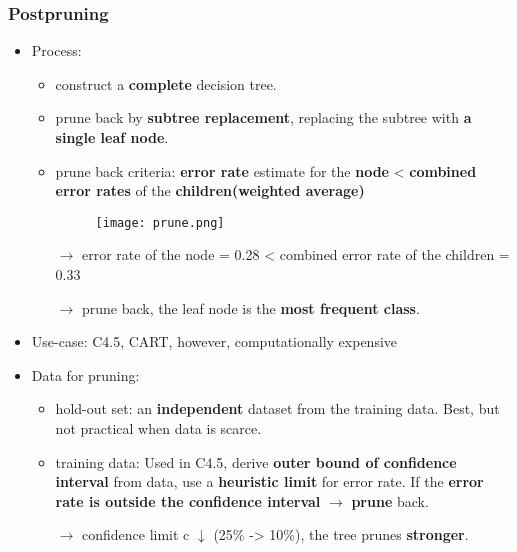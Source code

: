 \subsubsection{Postpruning}
\begin{itemize}
	
	\item Process: 
	\begin{itemize}
		\item construct a \textbf{complete} decision tree.
		\item prune back by \textbf{subtree replacement}, replacing the subtree with \textbf{a single leaf node}.
		\item prune back criteria: \textbf{error rate} estimate for the \textbf{node} < \textbf{combined error rates} of the \textbf{children(weighted average)} 
		
		\begin{figure}[H]
			\centering
			\texttt{[image: prune.png]}
		\end{figure}
		$\rightarrow$ error rate of the node = 0.28 < combined error rate of the children = 0.33 
		
		$\rightarrow$ prune back, the leaf node is the \textbf{most frequent class}.
	\end{itemize}
	\item Use-case: C4.5, CART, however, computationally expensive
	\item Data for pruning:
	\begin{itemize}
		\item hold-out set: an \textbf{independent} dataset from the training data. Best, but not practical when data is scarce.
		\item training data: Used in C4.5, derive \textbf{outer bound of confidence interval} from data, use a \textbf{heuristic limit} for error rate. If the \textbf{error rate is outside the confidence interval} $\rightarrow$ \textbf{prune} back. 
		
		$\rightarrow$ confidence limit c $\downarrow$ (25\% -> 10\%), the tree prunes \textbf{stronger}.
	\end{itemize}
\end{itemize}



